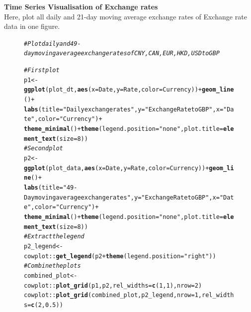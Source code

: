 \documentclass{article}\usepackage[]{graphicx}\usepackage[]{xcolor}
\makeatletter
\newcommand{\hlnum}[1]{\textcolor[rgb]{0.686,0.059,0.569}{#1}}%
\newcommand{\hlstr}[1]{\textcolor[rgb]{0.192,0.494,0.8}{#1}}%
\newcommand{\hlcom}[1]{\textcolor[rgb]{0.678,0.584,0.686}{\textit{#1}}}%
\newcommand{\hlopt}[1]{\textcolor[rgb]{0,0,0}{#1}}%
\newcommand{\hlstd}[1]{\textcolor[rgb]{0.345,0.345,0.345}{#1}}%
\newcommand{\hlkwb}[1]{\textcolor[rgb]{0.69,0.353,0.396}{#1}}%
\newcommand{\hlkwc}[1]{\textcolor[rgb]{0.333,0.667,0.333}{#1}}%
\newcommand{\hlkwd}[1]{\textcolor[rgb]{0.737,0.353,0.396}{\textbf{#1}}}%
\newenvironment{kframe}{%
 \def\at@end@of@kframe{}%
 \ifinner\ifhmode%
  \def\at@end@of@kframe{\end{minipage}}%
  \begin{minipage}{\columnwidth}%
 \fi\fi%
 \def\FrameCommand##1{\hskip\@totalleftmargin \hskip-\fboxsep
 \colorbox{shadecolor}{##1}\hskip-\fboxsep
     \hskip-\linewidth \hskip-\@totalleftmargin \hskip\columnwidth}%
 \MakeFramed {\advance\hsize-\width
   \@totalleftmargin\z@ \linewidth\hsize
   \@setminipage}}%
 {\par\unskip\endMakeFramed%
 \at@end@of@kframe}
\newenvironment{knitrout}{}{} %
\makeatother
\begin{document}
\noindent
\textbf{Time Series Visualisation of Exchange rates}\\

\noindent
Here, plot all daily and 21-day moving average exchange rates of Exchange rate data in one figure.

\begin{figure}[H]
\begin{knitrout}\scriptsize
{}\color{fgcolor}\begin{kframe}
\begin{alltt}
\hlcom{# Plot daily and 49-day moving average exchange rates of CNY, CAN, EUR, HKD, USD to GBP}

\hlcom{# First plot}
\hlstd{p1} \hlkwb{<-} \hlkwd{ggplot}\hlstd{(plot_dt,} \hlkwd{aes}\hlstd{(}\hlkwc{x}\hlstd{=Date,} \hlkwc{y}\hlstd{=Rate,} \hlkwc{color}\hlstd{=Currency))} \hlopt{+} \hlkwd{geom_line}\hlstd{()} \hlopt{+}
  \hlkwd{labs}\hlstd{(}\hlkwc{title}\hlstd{=}\hlstr{"Daily exchange rates"}\hlstd{,}\hlkwc{y}\hlstd{=}\hlstr{"Exchange Rate to GBP"}\hlstd{,} \hlkwc{x}\hlstd{=}\hlstr{"Date"}\hlstd{,} \hlkwc{color}\hlstd{=}\hlstr{"Currency"}\hlstd{)}\hlopt{+}
  \hlkwd{theme_minimal}\hlstd{()} \hlopt{+} \hlkwd{theme}\hlstd{(}\hlkwc{legend.position}\hlstd{=}\hlstr{"none"}\hlstd{,}\hlkwc{plot.title} \hlstd{=} \hlkwd{element_text}\hlstd{(}\hlkwc{size}\hlstd{=}\hlnum{8}\hlstd{))}
\hlcom{# Second plot}
\hlstd{p2} \hlkwb{<-} \hlkwd{ggplot}\hlstd{(plot_data,} \hlkwd{aes}\hlstd{(}\hlkwc{x}\hlstd{=Date,} \hlkwc{y}\hlstd{=Rate,} \hlkwc{color}\hlstd{=Currency))} \hlopt{+} \hlkwd{geom_line}\hlstd{()} \hlopt{+}
  \hlkwd{labs}\hlstd{(}\hlkwc{title}\hlstd{=}\hlstr{"49-Day moving average exchange rates"}\hlstd{,}\hlkwc{y}\hlstd{=}\hlstr{"Exchange Rate to GBP"}\hlstd{,} \hlkwc{x}\hlstd{=}\hlstr{"Date"}\hlstd{,} \hlkwc{color}\hlstd{=}\hlstr{"Currency"}\hlstd{)}\hlopt{+}
  \hlkwd{theme_minimal}\hlstd{()} \hlopt{+} \hlkwd{theme}\hlstd{(}\hlkwc{legend.position}\hlstd{=}\hlstr{"none"}\hlstd{,}\hlkwc{plot.title} \hlstd{=} \hlkwd{element_text}\hlstd{(}\hlkwc{size}\hlstd{=}\hlnum{8}\hlstd{))}
\hlcom{# Extract the legend}
\hlstd{p2_legend} \hlkwb{<-} \hlstd{cowplot}\hlopt{::}\hlkwd{get_legend}\hlstd{(p2} \hlopt{+} \hlkwd{theme}\hlstd{(}\hlkwc{legend.position}\hlstd{=}\hlstr{"right"}\hlstd{))}
\hlcom{# Combine the plots }
\hlstd{combined_plot} \hlkwb{<-} \hlstd{cowplot}\hlopt{::}\hlkwd{plot_grid}\hlstd{(p1, p2,} \hlkwc{rel_widths} \hlstd{=} \hlkwd{c}\hlstd{(}\hlnum{1}\hlstd{,} \hlnum{1}\hlstd{),} \hlkwc{nrow}\hlstd{=}\hlnum{2}\hlstd{)}
\hlstd{cowplot}\hlopt{::}\hlkwd{plot_grid}\hlstd{(combined_plot, p2_legend,} \hlkwc{nrow}\hlstd{=}\hlnum{1}\hlstd{,} \hlkwc{rel_widths} \hlstd{=} \hlkwd{c}\hlstd{(}\hlnum{2}\hlstd{,} \hlnum{0.5}\hlstd{))}
\end{alltt}
\end{kframe}


\end{knitrout}
\end{figure}
\end{document}

